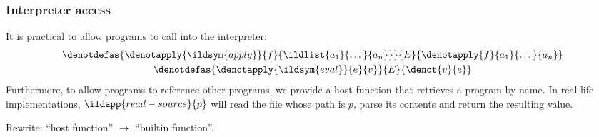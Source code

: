\subsubsection{Interpreter access}
It is practical to allow programs to call into the interpreter:
\begin{equation}\begin{gathered}
  \denotdefas{\denotapply{\ildsym{apply}}{f}{\ildlist{a_1}{\dots}{a_n}}}{E}{\denotapply{f}{a_1}{\dots}{a_n}}\\
  \denotdefas{\denotapply{\ildsym{eval}}{e}{v}}{E}{\denot{v}{e}}
\end{gathered}\end{equation}
Furthermore, to allow programs to reference other programs, we provide
a host function  that retrieves a program by name.
In real-life implementations, \(\ildapp{read-source}{p}\) will read
the file whose path is \(p\), parse its contents and return the resulting value.
\begin{note}
  Rewrite: ``host function'' \(\to\) ``builtin function''.
\end{note}
